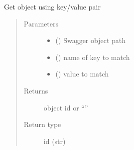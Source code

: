 \documentclass[letterpaper,10pt,english]{sphinxmanual}
\begin{document}
\begin{fulllineitems}
\begin{fulllineitems}
\begin{quote}
\begin{description}
\end{description}\end{quote}

\end{fulllineitems}


\begin{fulllineitems}
\label{\detokenize{b1tdep-class:bloxone.b1tdep.get_object_by_key}}
\sphinxAtStartPar
Get object using key/value pair
\begin{quote}\begin{description}
\item[{Parameters}] \leavevmode\begin{itemize}
\item {} 
\sphinxAtStartPar
{} () \textendash{} Swagger object path

\item {} 
\sphinxAtStartPar
{} () \textendash{} name of key to match

\item {} 
\sphinxAtStartPar
{} () \textendash{} value to match

\end{itemize}

\item[{Returns}] \leavevmode
\sphinxAtStartPar
object id or “”

\item[{Return type}] \leavevmode
\sphinxAtStartPar
id (str)

\end{description}\end{quote}

\end{fulllineitems}


\end{fulllineitems}
\end{document}
